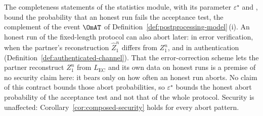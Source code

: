 
\begin{remark}\label{rem:completeness-scope}
The completeness statements of the statistics module,
 with its parameter
$\varepsilon^{\star}$ and ,
bound the probability that an honest run fails the acceptance test, the
complement of the event $\OmAT$ of
Definition~\ref{def:postprocessing-model}\,(i). An honest run of the
fixed-length protocol can also abort later: in error verification, when the
partner's reconstruction $\hat Z_1^n$ differs from $Z_1^n$, and in
authentication
(Definition~\ref{def:authenticated-channel}). That the error-correction scheme lets the partner reconstruct $Z_1^n$
from $L_{\mathrm{EC}}$ and its own data on honest runs is a premise of no
security claim here: it bears only on how often an honest run aborts. No
claim of this contract bounds those abort probabilities, so $\varepsilon^{\star}$ bounds the honest abort
probability of the acceptance test and not that of the whole protocol.
Security is unaffected: Corollary~\ref{cor:composed-security} holds for every
abort pattern.
\end{remark}
